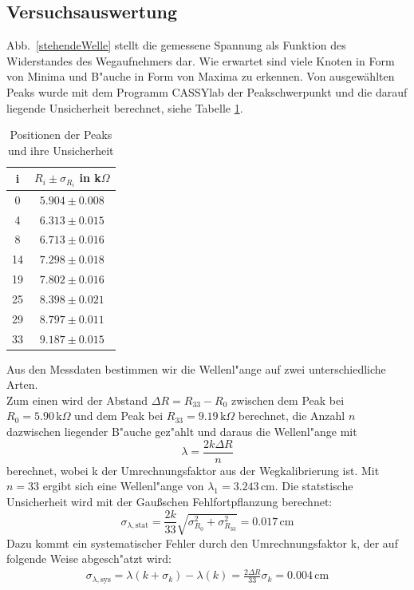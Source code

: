 \documentclass[12pt,a4paper]{article}
\begin{document}
\subsection{Versuchsauswertung}
Abb.~\ref{stehendeWelle} stellt die gemessene Spannung als Funktion des Widerstandes des Wegaufnehmers dar. Wie erwartet sind viele Knoten in Form von Minima und B"auche in Form von Maxima zu erkennen. Von ausgewählten Peaks wurde mit dem Programm CASSYlab der Peakschwerpunkt und die darauf liegende Unsicherheit berechnet, siehe Tabelle \ref{tab:stehendeWellePeaks}.
\begin{table}[H]
	\centering
	\begin{tabular}{|c|c|}
		\hline 
		i&$R_i\pm\sigma_{R_i}$ in k$\Omega$\\ 
		\hline
		0&$5.904\pm0.008$\\
		4&$6.313\pm0.015$\\
		8&$6.713\pm0.016$\\
		14&$7.298\pm0.018$\\
		19&$7.802\pm0.016$\\
		25&$8.398\pm0.021$\\
		29&$8.797\pm0.011$\\
		33&$9.187\pm0.015$\\
		\hline
	\end{tabular} 
	\caption{Positionen der Peaks und ihre Unsicherheit}
	\label{tab:stehendeWellePeaks}
\end{table}
Aus den Messdaten bestimmen wir die Wellenl"ange auf zwei unterschiedliche Arten.\\
Zum einen wird der Abstand $\Delta R=R_{33}-R_0$ zwischen dem Peak bei $R_0=5.90\,\text{k}\Omega$ und dem Peak bei $R_{33}=9.19\,\text{k}\Omega$ berechnet, die Anzahl $n$ dazwischen liegender B"auche gez"ahlt und daraus die Wellenl"ange mit 
\begin{equation}
\lambda=\frac{2k\Delta R}{n}
\end{equation}
berechnet, wobei k der Umrechnungsfaktor aus der Wegkalibrierung ist.  Mit $n=33$ ergibt sich eine Wellenl"ange von $\lambda_1=3.243\,\text{cm}$. Die statstische Unsicherheit wird mit der Gaußschen Fehlfortpflanzung berechnet:
\begin{equation}
\sigma_{\lambda,\text{stat}}=\frac{2k}{33}\sqrt{\sigma_{R_0}^2+\sigma_{R_{33}}^2}=0.017\,\text{cm}
\end{equation}
Dazu kommt ein systematischer Fehler durch den Umrechnungsfaktor k, der auf folgende Weise abgesch"atzt wird:
\begin{align}
\sigma_{\lambda,\text{sys}}=\lambda(k+\sigma_k)-\lambda(k)=\frac{2\Delta R}{33}\sigma_k=0.004\,\text{cm}
\end{align}
\end{document}
